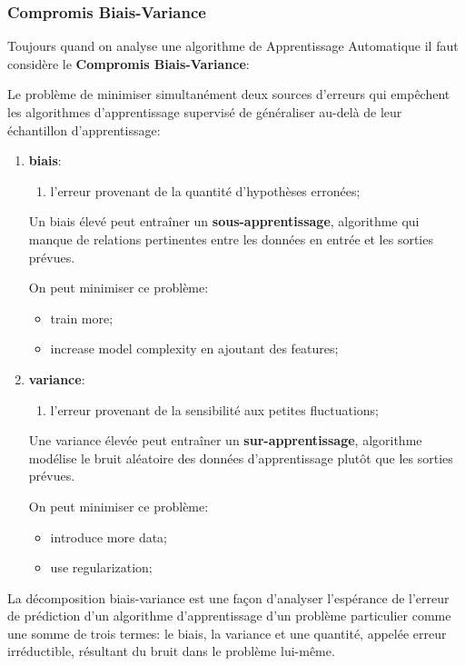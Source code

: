 \documentclass{article}
\begin{document}
\subsubsection{Compromis Biais-Variance}
Toujours quand on analyse une algorithme de Apprentissage Automatique il faut considère le \textbf{Compromis Biais-Variance}:
\begin{definition}
    Le problème de minimiser simultanément deux sources d'erreurs qui empêchent les algorithmes d'apprentissage supervisé de généraliser au-delà de leur échantillon d'apprentissage:
    \begin{enumerate}[rightmargin = \leftmargin]
        \item \textbf{biais}:
        \begin{enumerate}[noitemsep]
            \item l'erreur provenant de la quantité d'hypothèses erronées;
        \end{enumerate}
        \begin{remark}
            Un biais élevé peut entraîner un \textbf{sous-apprentissage}, algorithme qui manque de relations pertinentes entre les données en entrée et les sorties prévues.
        \end{remark}
        On peut minimiser ce problème:
        \begin{itemize}[noitemsep]
            \item train more;
            \item increase model complexity en ajoutant des features;
        \end{itemize}

        \item \textbf{variance}:
        \begin{enumerate}[noitemsep]
            \item l'erreur provenant de la sensibilité aux petites fluctuations;
        \end{enumerate}
        \begin{remark}
            Une variance élevée peut entraîner un \textbf{sur-apprentissage}, algorithme modélise le bruit aléatoire des données d'apprentissage plutôt que les sorties prévues.
        \end{remark}
        On peut minimiser ce problème:
        \begin{itemize}[noitemsep]
            \item introduce more data;
            \item use regularization;
        \end{itemize}
    \end{enumerate}    
    La décomposition biais-variance est une façon d'analyser l'espérance de l'erreur de prédiction d'un algorithme d'apprentissage d'un problème particulier comme une somme de trois termes: le biais, la variance et une quantité, appelée erreur irréductible, résultant du bruit dans le problème lui-même. 
\end{definition}
\end{document}
